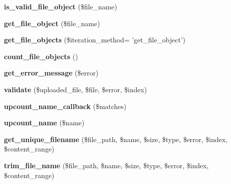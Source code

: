 \begin{DoxyCompactItemize}
\item 
\hypertarget{class_upload_handler_a63648aea7aa000b5f9094a76a04f03c5}{{\bfseries is\-\_\-valid\-\_\-file\-\_\-object} (\$file\-\_\-name)}\label{class_upload_handler_a63648aea7aa000b5f9094a76a04f03c5}

\item 
\hypertarget{class_upload_handler_acbb37fa4e6d01199791a96a674a600fc}{{\bfseries get\-\_\-file\-\_\-object} (\$file\-\_\-name)}\label{class_upload_handler_acbb37fa4e6d01199791a96a674a600fc}

\item 
\hypertarget{class_upload_handler_a536813f557bff2361c01efa1ce27a974}{{\bfseries get\-\_\-file\-\_\-objects} (\$iteration\-\_\-method= 'get\-\_\-file\-\_\-object')}\label{class_upload_handler_a536813f557bff2361c01efa1ce27a974}

\item 
\hypertarget{class_upload_handler_a56b6a5c87c3c4711203072d93625051d}{{\bfseries count\-\_\-file\-\_\-objects} ()}\label{class_upload_handler_a56b6a5c87c3c4711203072d93625051d}

\item 
\hypertarget{class_upload_handler_ad794fb9ba351e9e44499d3d5af1635c2}{{\bfseries get\-\_\-error\-\_\-message} (\$error)}\label{class_upload_handler_ad794fb9ba351e9e44499d3d5af1635c2}

\item 
\hypertarget{class_upload_handler_abd809343b5c960e5b97c725c6337b0c4}{{\bfseries validate} (\$uploaded\-\_\-file, \$file, \$error, \$index)}\label{class_upload_handler_abd809343b5c960e5b97c725c6337b0c4}

\item 
\hypertarget{class_upload_handler_a3a9abbb303b8995922826ed7a45d1a97}{{\bfseries upcount\-\_\-name\-\_\-callback} (\$matches)}\label{class_upload_handler_a3a9abbb303b8995922826ed7a45d1a97}

\item 
\hypertarget{class_upload_handler_a4449667ab140109509f8c58e98180297}{{\bfseries upcount\-\_\-name} (\$name)}\label{class_upload_handler_a4449667ab140109509f8c58e98180297}

\item 
\hypertarget{class_upload_handler_a163373f2907e116da9d127641beb04c3}{{\bfseries get\-\_\-unique\-\_\-filename} (\$file\-\_\-path, \$name, \$size, \$type, \$error, \$index, \$content\-\_\-range)}\label{class_upload_handler_a163373f2907e116da9d127641beb04c3}

\item 
\hypertarget{class_upload_handler_a4ec037e239c1745853a26d4f525dbf68}{{\bfseries trim\-\_\-file\-\_\-name} (\$file\-\_\-path, \$name, \$size, \$type, \$error, \$index, \$content\-\_\-range)}\label{class_upload_handler_a4ec037e239c1745853a26d4f525dbf68}


\end{DoxyCompactItemize}
